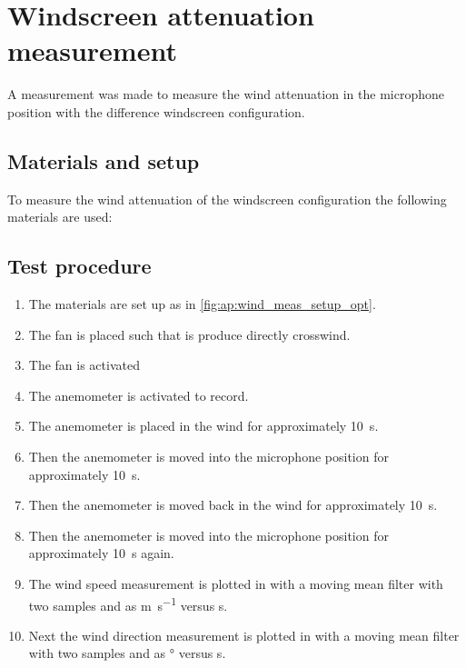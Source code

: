 \chapter{Windscreen attenuation measurement}
A measurement was made to measure the wind attenuation in the microphone position with the difference windscreen configuration.


\section*{Materials and setup}
To measure the wind attenuation of the windscreen configuration the following materials are used:

\startequipment
{}
\stopequipment




\section*{Test procedure}


\begin{enumerate}
\item The materials are set up as in \autoref{fig:ap:wind_meas_setup_opt}.
\item The fan is placed such that is produce directly crosswind.
\item The fan is activated 
\item The anemometer is activated to record.
\item The anemometer is placed in the wind for approximately \SI{10}{\second}.
\item Then the anemometer is moved into the microphone position for approximately \SI{10}{\second}.
\item Then the anemometer is moved back in the wind for approximately \SI{10}{\second}.
\item Then the anemometer is moved into the microphone position for approximately \SI{10}{\second} again. 
\item The wind speed measurement is plotted in \matlab with a moving mean filter with two samples and as \si{\meter\per\second} versus \si{\second}.
\item Next the wind direction measurement is plotted in \matlab with a moving mean filter with two samples and as \si{\degree} versus \si{\second}.
\end{enumerate}


